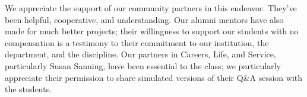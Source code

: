 \begin{acks}
We appreciate the support of our community partners in this endeavor.
They've been helpful, cooperative, and understanding.  Our alumni mentors
have also made for much better projects; their willingness to support
our students with no compensation is a testimony to their
commitment to our institution, the department, and the discipline.  
Our partners in Careers, Life, and Service, particularly Susan
Sanning, have been essential to the class; we particularly appreciate
their permission to share simulated versions of their Q\&A session
with the students.  
\end{acks}
